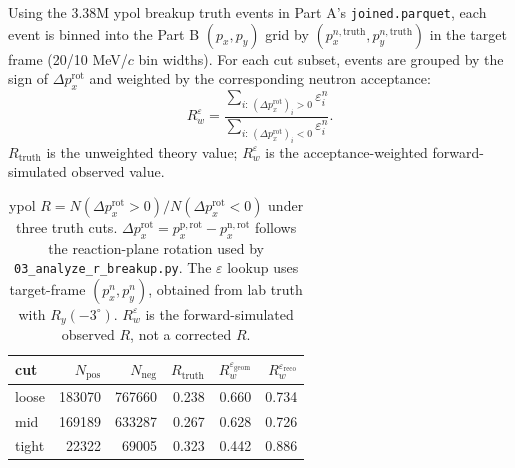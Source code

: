 \documentclass[a4paper,11pt]{article}
\begin{document}
Using the 3.38M ypol breakup truth events in Part A's \texttt{joined.parquet},
each event is binned into the Part B $(p_x,p_y)$ grid by
$(p_x^{n,\mathrm{truth}},p_y^{n,\mathrm{truth}})$ in the target frame
(20/10 MeV/$c$ bin widths). For each cut subset, events are grouped by the sign
of $\Delta p_x^\mathrm{rot}$ and weighted by the corresponding neutron
acceptance:
\[
R_w^\varepsilon =
\frac{\sum_{i:\,(\Delta p_x^\mathrm{rot})_i>0}\varepsilon_i^n}
     {\sum_{i:\,(\Delta p_x^\mathrm{rot})_i<0}\varepsilon_i^n}.
\]
$R_\mathrm{truth}$ is the unweighted theory value; $R_w^\varepsilon$ is the
acceptance-weighted forward-simulated observed value.

\begin{table}[h]
\centering
\caption{ypol
$R=N(\Delta p_x^\mathrm{rot}>0)/N(\Delta p_x^\mathrm{rot}<0)$ under three truth
cuts. $\Delta p_x^\mathrm{rot} =
p_x^{\mathrm{p,rot}} - p_x^{\mathrm{n,rot}}$ follows the reaction-plane rotation
used by \texttt{03\_analyze\_r\_breakup.py}. The $\varepsilon$ lookup uses
target-frame $(p_x^n,p_y^n)$, obtained from lab truth with $R_y(-3^\circ)$.
$R_w^\varepsilon$ is the forward-simulated observed $R$, not a corrected $R$.}
\label{tab:R_acceptance}
\begin{tabular}{lrrrrr}
\toprule
cut & $N_\mathrm{pos}$ & $N_\mathrm{neg}$ & $R_\mathrm{truth}$ &
$R_w^{\varepsilon_\mathrm{geom}}$ & $R_w^{\varepsilon_\mathrm{reco}}$ \\
\midrule
loose & 183070 & 767660 & 0.238 & 0.660 & 0.734 \\
mid   & 169189 & 633287 & 0.267 & 0.628 & 0.726 \\
tight &  22322 &  69005 & 0.323 & 0.442 & 0.886 \\
\bottomrule
\end{tabular}
\end{table}
\end{document}
